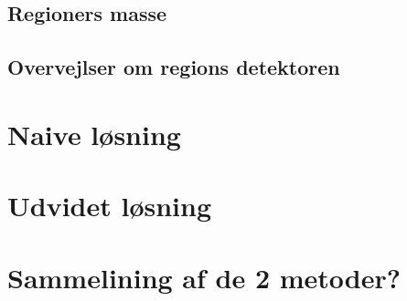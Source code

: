 {\subsection{Regioners masse}

\clearpage

\subsection{Overvejlser om regions detektoren}



\section{Naive løsning}

\clearpage

\section{Udvidet løsning}

\clearpage

\section{Sammelining af de 2 metoder?}

\clearpage


}

